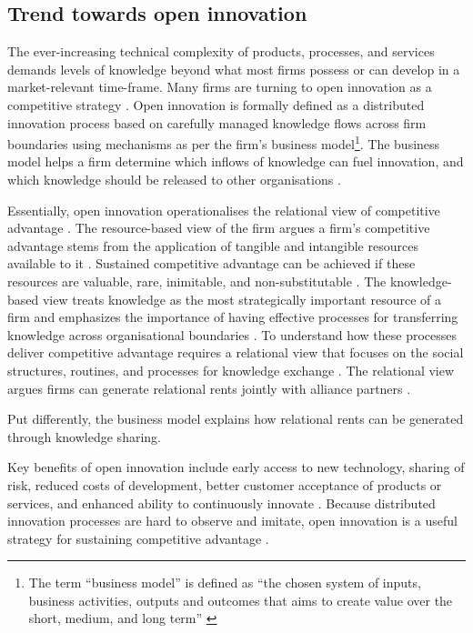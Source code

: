 \subsection{Trend towards open innovation}

The ever-increasing technical complexity of products, processes, and services demands levels of knowledge beyond what most firms possess or can develop in a market-relevant time-frame. Many firms are turning to open innovation as a competitive strategy \citep{enkel2009open,bessant2013innovation}. Open innovation is formally defined as a distributed innovation process based on carefully managed knowledge flows across firm boundaries using mechanisms as per the firm's business model\footnote{The term \enquote{business model} is defined as \enquote{the chosen system of inputs, business activities, outputs and outcomes that aims to create value over the short, medium, and long term} \citep{gould2013business}}. The business model helps a firm determine which inflows of knowledge can fuel innovation, and which knowledge should be released to other organisations \citep{chesbrough2017future}. \medskip 

Essentially, open innovation operationalises the relational view of competitive advantage \citep{dyer1998relational}. The resource-based view of the firm argues a firm's competitive advantage stems from the application of tangible and intangible resources available to it \citep{wernerfelt1984resource,peteraf1993cornerstones}. Sustained competitive advantage can be achieved if these resources are valuable, rare, inimitable, and non-substitutable \citep{barney1991firm}. The knowledge-based view treats knowledge as the most strategically important resource of a firm and emphasizes the importance of having effective processes for transferring knowledge across organisational boundaries \citep{kogut1992knowledge,drucker1994post,grant1996toward}. To understand how these processes deliver competitive advantage requires a relational view that focuses on the social structures, routines, and processes for knowledge exchange \citep{dyer1998relational}. The relational view argues firms can generate relational rents jointly with alliance partners \citep{dyer1998relational,lavie2006competitive}.  \medskip

Put differently, the business model explains how relational rents can be generated through knowledge sharing. \medskip

Key benefits of open innovation include early access to new technology, sharing of risk, reduced costs of development, better customer acceptance of products or services, and enhanced ability to continuously innovate \citep{ye2013exploring}. Because distributed innovation processes are hard to observe and imitate, open innovation is a useful strategy for sustaining competitive advantage \citep{barney1991firm,lichtenthaler2011open}. \medskip

